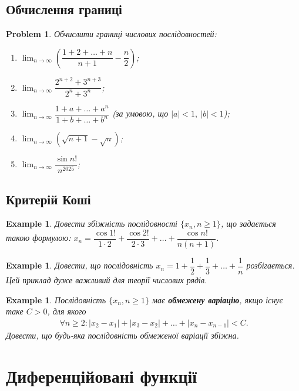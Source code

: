 \documentclass[a4paper, 14pt]{article}
\theoremstyle{theoremdd}
\theoremstyle{theoremdd}
\theoremstyle{theoremdd}
\theoremstyle{theoremdd}
\newtheorem{example}[theorem]{Example}
\theoremstyle{theoremdd}
\theoremstyle{theoremdd}
\theoremstyle{theoremdd}
\theoremstyle{theoremdd}
\newtheorem{problem}[theorem]{Problem}
\theoremstyle{theoremdd}
\begin{document}
\subsection{Обчислення границі}
\begin{problem}
Обчислити границі числових послідовностей:
\begin{enumerate}[nosep,wide=0pt,label={\arabic*)}]
\item $\displaystyle\lim_{n \to \infty} \left( \dfrac{1+2+\dots+n}{n+1} - \dfrac{n}{2} \right)$;
\item $\displaystyle\lim_{n \to \infty} \dfrac{2^{n+2} + 3^{n+3}}{2^n + 3^n}$;
\item $\displaystyle\lim_{n \to \infty} \dfrac{1+a+\dots+a^n}{1+b+\dots+b^n}$ (за умовою, що $|a| < 1,\ |b|<1$);
\item $\displaystyle\lim_{n \to \infty} (\sqrt{n+1} - \sqrt{n})$;
\item $\displaystyle\lim_{n \to \infty} \dfrac{\sin n!}{n^{2025}}$;
\end{enumerate}
\end{problem}

\subsection{Критерій Коші}
\begin{example}
Довести збіжність послідовності $\{x_n, n \geq 1\}$, що задається такою формулою: $x_n = \dfrac{\cos 1!}{1 \cdot 2} + \dfrac{\cos 2!}{2 \cdot 3} + \dots + \dfrac{\cos n!}{n(n+1)}$.
\end{example}

\begin{example}
Довести, що послідовність $x_n = 1 + \dfrac{1}{2} + \dfrac{1}{3} + \dots + \dfrac{1}{n}$ розбігається.\\
\textit{Цей приклад дуже важливий для теорії числових рядів.}
\end{example}

\begin{example}
Послідовність $\{x_n,n \geq 1\}$ має \textbf{обмежену варіацію}, якщо існує таке $C > 0$, для якого
\begin{align*}
\forall n \geq 2: |x_2 - x_1| + |x_3 - x_2| + \dots + |x_n - x_{n-1}| < C.
\end{align*}
Довести, що будь-яка послідовність обмеженої варіації збіжна.
\end{example}
\newpage

\section{Диференційовані функції}
\end{document}
